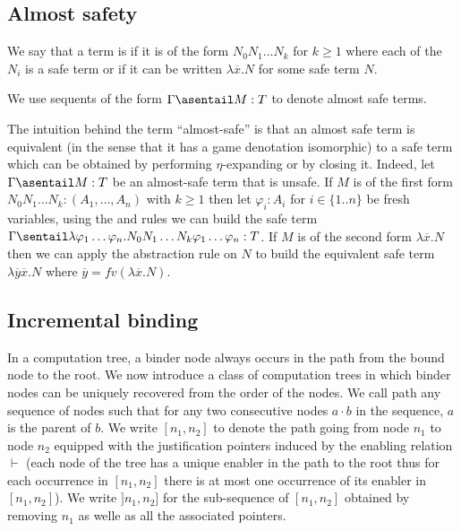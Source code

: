 \subsection{Almost safety}
\begin{definition}
We say that a term is  if it is of the form
$N_0 N_1 \ldots N_k$ for $k\geq 1$ where each of the $N_i$ is a safe
term or if it can be written $\lambda \overline{x} . N$ for some
safe term $N$.

We use sequents of the form $\Gamma \asentail M: T$ to denote almost safe terms.
\end{definition}
\begin{remark}
\label{rem:almostsafe}
The intuition behind the term ``almost-safe'' is that
an almost safe term is equivalent (in the sense that it has a game
denotation isomorphic) to a safe term which can be obtained by performing $\eta$-expanding or
by closing it. Indeed, let $\Gamma \asentail M :T$ be an almost-safe term that is unsafe. If $M$ is of the first form
$N_0 N_1 \ldots N_k : (A_1,\ldots,A_n)$ with $k\geq 1$ then let
$\varphi_i:A_i$ for $i\in\{1..n\}$ be fresh variables, using the
 and  rules we can build the safe term $\Gamma \sentail \lambda \varphi_1 \ldots \varphi_n . N_0 N_1 \ldots N_k \varphi_1 \ldots \varphi_n :T$.
If $M$ is of the second form $\lambda \overline{x} . N$ then we can apply
the abstraction rule on $N$ to build the equivalent safe term $\lambda
\overline{y} \overline{x}. N$ where $\overline{y} = fv(\lambda
\overline{x}. N)$.
\end{remark}

\subsection{Incremental binding}

In a computation tree, a binder node always occurs in the path from
the bound node to the root. We now introduce a class of computation
trees in which binder nodes can be uniquely recovered from the order
of the nodes. We call path any sequence of nodes such that for any
two consecutive nodes $a \cdot b$ in the sequence, $a$ is the parent
of $b$. We write $[n_1,n_2]$ to denote the path going from node
$n_1$ to node $n_2$ equipped with the justification pointers induced
by the enabling relation $\vdash$ (each node of the tree has a
unique enabler in the path to the root thus for each occurrence in
$[n_1,n_2]$ there is at most one occurrence of its enabler in
$[n_1,n_2]$). We write $]n_1,n_2]$ for the sub-sequence of
$[n_1,n_2]$ obtained by removing $n_1$ as welle as all the
associated pointers.

